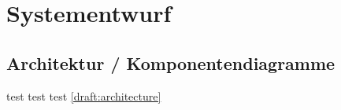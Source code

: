\documentclass[
	12pt,
	table,
	bigheadings,
	ngerman,
	a4paper,
	BCOR5mm,
	DIV14,
	1.1headlines,
	pagesize,
	oneside,
	openright,
	titlepage,
	headsepline,
	nochapterprefix,
	bibtotoc,
	tocindent,
	listsindent,
	pointlessnumbers,
	cleardoubleempty,
	fleqn,
	halfparskip
]{scrbook}
\newcommand{\todo}[1]{\textcolor{red}{TODO: #1}}
\begin{document}
	\sloppy
	
	\setcounter{page}{0}
	
	
	
	
	
	
	
	\thispagestyle{empty}
	
	
	\clearpage	
	\hypersetup{allcolors=black}
	\tableofcontents
	\hypersetup{allcolors=blue}
	\newpage
	
	
	\setcounter{page}{1}
	
	
	
	
		
	
	
	
	
	
	
	
		
	\chapter{Systementwurf}
		\section{Architektur / Komponentendiagramme}
		
		test test test \autoref{draft:architecture}
		
\end{document}
